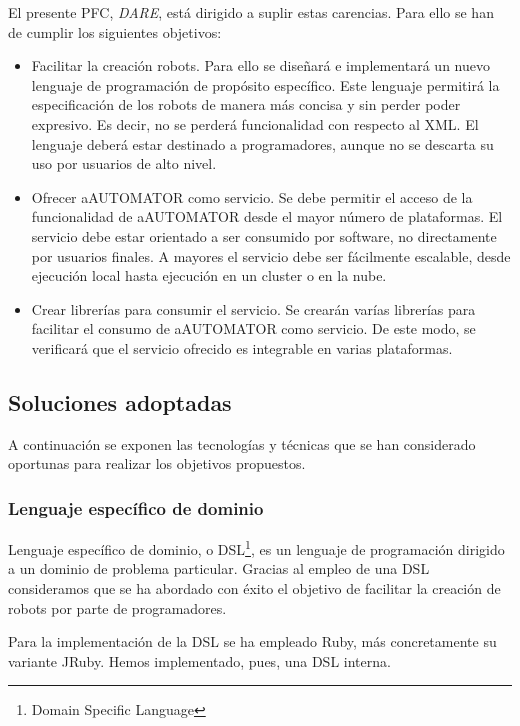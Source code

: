 El presente PFC, \emph{DARE}, está dirigido a suplir estas
carencias. Para ello se han de cumplir los siguientes objetivos:

\begin{itemize}
  \item Facilitar la creación robots. Para ello se diseñará e
    implementará un nuevo lenguaje de programación de propósito
    específico. Este lenguaje permitirá la especificación de los
    robots de manera más concisa y sin perder poder expresivo. Es
    decir, no se perderá funcionalidad con respecto al XML. El
    lenguaje deberá estar destinado a programadores, aunque no se
    descarta su uso por usuarios de alto nivel.

  \item Ofrecer aAUTOMATOR como servicio. Se debe permitir el acceso
    de la funcionalidad de aAUTOMATOR desde el mayor número de
    plataformas. El servicio debe estar orientado a ser consumido por
    software, no directamente por usuarios finales. A mayores el
    servicio debe ser fácilmente escalable, desde ejecución local
    hasta ejecución en un cluster o en la nube.

  \item Crear librerías para consumir el servicio. Se crearán varías
    librerías para facilitar el consumo de aAUTOMATOR como
    servicio. De este modo, se verificará que el servicio ofrecido es
    integrable en varias plataformas.
\end{itemize}

\subsection{Soluciones adoptadas}

A continuación se exponen las tecnologías y técnicas que se han
considerado oportunas para realizar los objetivos propuestos.

\subsubsection{Lenguaje específico de dominio}
Lenguaje específico de dominio, o
DSL\cite{DSL}\footnote{Domain Specific Language}, es un lenguaje
de programación dirigido a un dominio de problema
particular. Gracias al empleo de una DSL consideramos que se ha
abordado con éxito el objetivo de facilitar la creación de robots
por parte de programadores.

Para la implementación de la DSL se ha empleado Ruby\cite{RUBY},
más concretamente su variante JRuby. Hemos implementado, pues, una
DSL interna\cite{DSL}.

